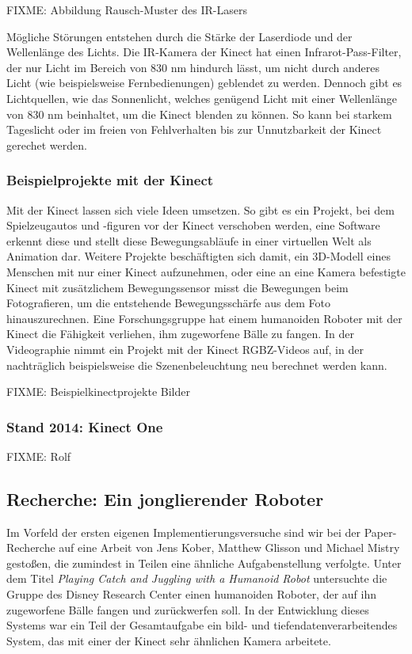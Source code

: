 \documentclass[12pt,a4paper,ngerman]{scrartcl}
\begin{document}
{\color{red} FIXME: Abbildung Rausch-Muster des IR-Lasers}

Mögliche Störungen entstehen durch die Stärke der Laserdiode und der Wellenlänge des Lichts.
Die IR-Kamera der Kinect hat einen Infrarot-Pass-Filter, der nur Licht im Bereich von 830 nm
hindurch lässt, um nicht durch anderes Licht (wie beispielsweise Fernbedienungen) geblendet zu
werden. Dennoch gibt es Lichtquellen, wie das Sonnenlicht, welches genügend Licht mit einer
Wellenlänge von 830 nm  beinhaltet, um die Kinect blenden zu können. So kann bei starkem
Tageslicht oder im freien von Fehlverhalten bis zur Unnutzbarkeit der Kinect gerechet werden.

\subsubsection{Beispielprojekte mit der Kinect}

Mit der Kinect lassen sich viele Ideen umsetzen. So gibt es ein Projekt, bei dem Spielzeugautos und
-figuren vor der Kinect verschoben werden, eine Software erkennt diese und stellt diese Bewegungsabläufe
in einer virtuellen Welt als Animation dar.\cite{3dpuppetry} Weitere Projekte beschäftigten sich
damit, ein 3D-Modell eines Menschen mit nur einer Kinect aufzunehmen,\cite{kinectavatar} oder eine an eine Kamera
befestigte Kinect mit zusätzlichem Bewegungssensor misst die Bewegungen beim Fotografieren, um die
entstehende Bewegungsschärfe aus dem Foto hinauszurechnen.\cite{motiondeblurring} Eine Forschungsgruppe
hat einem humanoiden Roboter mit der Kinect die Fähigkeit verliehen, ihm zugeworfene Bälle zu fangen.\cite{kober}
In der Videographie nimmt ein Projekt mit der Kinect RGBZ-Videos auf, in der nachträglich beispielsweise die
Szenenbeleuchtung neu berechnet werden kann.\cite{rgbzvideos}

{\color{red} FIXME: Beispielkinectprojekte Bilder}

\subsubsection{Stand 2014: Kinect One}

{\color{red} FIXME: Rolf}

\subsection{Recherche: Ein jonglierender Roboter}

Im Vorfeld der ersten eigenen Implementierungsversuche sind wir bei der
Paper-Recherche auf eine Arbeit von Jens Kober, Matthew Glisson und Michael Mistry
gestoßen, die zumindest in Teilen eine ähnliche Aufgabenstellung verfolgte.
Unter dem Titel {\em Playing Catch and Juggling with a Humanoid Robot}\cite{kober}
untersuchte die Gruppe des Disney Research Center\cite{disneyresearch} einen
humanoiden Roboter, der auf ihn zugeworfene Bälle fangen und zurückwerfen soll.
In der Entwicklung dieses Systems war ein Teil der Gesamtaufgabe ein
bild- und tiefendatenverarbeitendes System, das mit einer der Kinect sehr ähnlichen
Kamera arbeitete.
\end{document}
